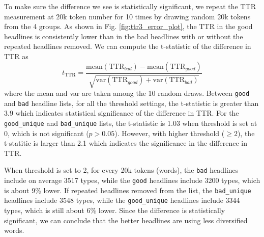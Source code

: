 \documentclass[%
preprint,
 amsmath,amssymb,
 aps,
]{revtex4-2}
\begin{document}
To make sure the difference we see is statistically significant, we repeat the TTR measurement at 20k token number for 10 times by drawing random 20k tokens from the 4 groups. As shown in Fig. \ref{fig:ttr3_error_plot}, the TTR in the good headlines is consistently lower than in the bad headlines with or without the repeated headlines removed.
We can compute the t-statistic of the difference in TTR as
\begin{equation}
    t_{\mathrm{TTR}} = \frac{\mathrm{mean}(\mathrm{TTR}_{bad}) - \mathrm{mean}(\mathrm{TTR}_{good})}{\sqrt{\mathrm{var}(\mathrm{TTR}_{good}) + \mathrm{var}(\mathrm{TTR}_{bad})}}
\end{equation}
where the mean and var are taken among the 10 random draws.
Between \texttt{good} and \texttt{bad} headline lists, for all the threshold settings, the t-statistic is greater than 3.9 which indicates statistical significance of the difference in TTR.
For the \texttt{good\_unique} and \texttt{bad\_unique} lists, the t-statistic is 1.03 when threshold is set at 0, which is not significant (\(p > 0.05\)).
However, with higher threshold (\(\geq 2\)), the t-statitic is larger than 2.1 which indicates the significance in the difference in TTR.

When threshold is set to 2, for every 20k tokens (words), the \texttt{bad} headlines include on average 3517 types, while the \texttt{good} headlines include 3200 types, which is about 9\% lower.
If repeated headlines removed from the list, the \texttt{bad\_unique} headlines include 3548 types, while the \texttt{good\_unique} headlines include 3344 types, which is still about 6\% lower.
Since the difference is statistically significant, we can conclude that the better headlines are using less diversified words.
\end{document}
